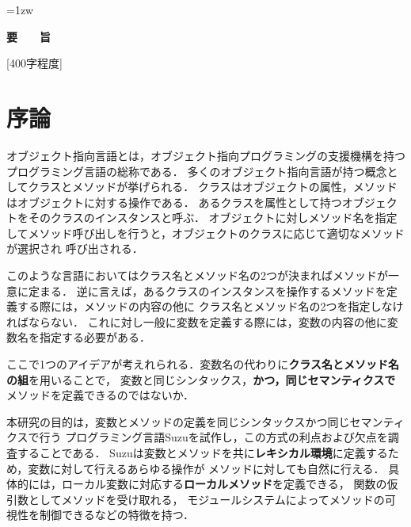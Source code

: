 \documentclass[a4paper,11pt,dvipdfmx]{jreport}
\title{\Underline{レキシカル環境にメソッドを定義する\\オブジェクト指向言語Suzu}}
\author{林 拓人}
\begin{document}
\maketitle
\thispagestyle{empty}
\newpage

\thispagestyle{empty}
\vspace*{20pt plus 1fil}
\parindent=1zw
\noindent
\begin{center}
{\Large \bf 要　　旨}
\vspace{2cm}
\end{center}
[400字程度]

\par
\vspace{0pt plus 1fil}
\newpage

\tableofcontents

\pagebreak \setcounter{page}{1}


\chapter{序論}

オブジェクト指向言語とは，オブジェクト指向プログラミングの支援機構を持つプログラミング言語の総称である．
多くのオブジェクト指向言語が持つ概念としてクラスとメソッドが挙げられる．
クラスはオブジェクトの属性，メソッドはオブジェクトに対する操作である．
あるクラスを属性として持つオブジェクトをそのクラスのインスタンスと呼ぶ．
オブジェクトに対しメソッド名を指定してメソッド呼び出しを行うと，オブジェクトのクラスに応じて適切なメソッドが選択され
呼び出される．

このような言語においてはクラス名とメソッド名の2つが決まればメソッドが一意に定まる．
逆に言えば，あるクラスのインスタンスを操作するメソッドを定義する際には，メソッドの内容の他に
クラス名とメソッド名の2つを指定しなければならない．
これに対し一般に変数を定義する際には，変数の内容の他に変数名を指定する必要がある．

ここで1つのアイデアが考えれられる．変数名の代わりに\textbf{クラス名とメソッド名の組}を用いることで，
変数と同じシンタックス，\textbf{かつ，同じセマンティクスで}メソッドを定義できるのではないか．

本研究の目的は，変数とメソッドの定義を同じシンタックスかつ同じセマンティクスで行う
プログラミング言語Suzuを試作し，この方式の利点および欠点を調査することである．
Suzuは変数とメソッドを共に\textbf{レキシカル環境}に定義するため，変数に対して行えるあらゆる操作が
メソッドに対しても自然に行える．
具体的には，ローカル変数に対応する\textbf{ローカルメソッド}を定義できる，
関数の仮引数としてメソッドを受け取れる，
モジュールシステムによってメソッドの可視性を制御できるなどの特徴を持つ．
\end{document}
